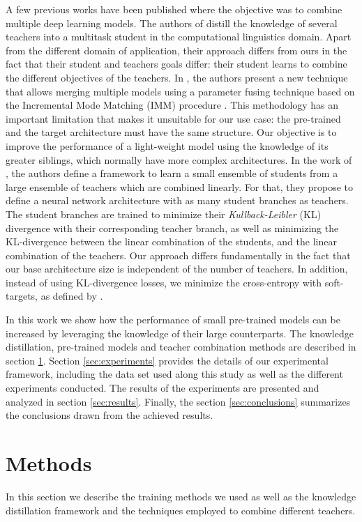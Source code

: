 \documentclass{elsarticle}
\begin{document}
	A few previous works have been published where the objective was to combine multiple deep learning models. The authors of \citep{liu2020} distill the knowledge of several teachers into a multitask student in the computational linguistics domain. Apart from the different domain of application, their approach differs from ours in the fact that their student and teachers goals differ: their student learns to combine the different objectives of the teachers. In \citep{geyer2019}, the authors present a new technique that allows merging multiple models using a parameter fusing technique based on the Incremental Mode Matching (IMM) procedure \citep{lee2017}. This methodology has an important limitation that makes it unsuitable for our use case: the pre-trained and the target architecture must have the same structure. Our objective is to improve the performance of a light-weight model using the knowledge of its greater siblings, which normally have more complex architectures. In the work of \citep{asif2019}, the authors define a framework to learn a small ensemble of students from a large ensemble of teachers which are combined linearly. For that, they propose to define a neural network architecture with as many student branches as teachers. The student branches are trained to minimize their \textit{Kullback-Leibler} (KL) divergence with their corresponding teacher branch, as well as minimizing the KL-divergence between the linear combination of the students, and the linear combination of the teachers. Our approach differs fundamentally in the fact that our base architecture size is independent of the number of teachers. In addition, instead of using KL-divergence losses, we minimize the cross-entropy with soft-targets, as defined by \citep{hinton2015}.

	In this work we show how the performance of small pre-trained models can be increased by leveraging the knowledge of their large counterparts. The knowledge distillation, pre-trained models and teacher combination methods are described in section  \ref{sec:methods}. Section \ref{sec:experiments} provides the details of our experimental framework, including the data set used along this study as well as the different experiments conducted. The results of the experiments are presented and analyzed in section \ref{sec:results}. Finally, the section \ref{sec:conclusions} summarizes the conclusions drawn from the achieved results.

	\section{Methods} \label{sec:methods}
	In this section we describe the training methods we used as well as the knowledge distillation framework and the techniques employed to combine different teachers.
\end{document}
